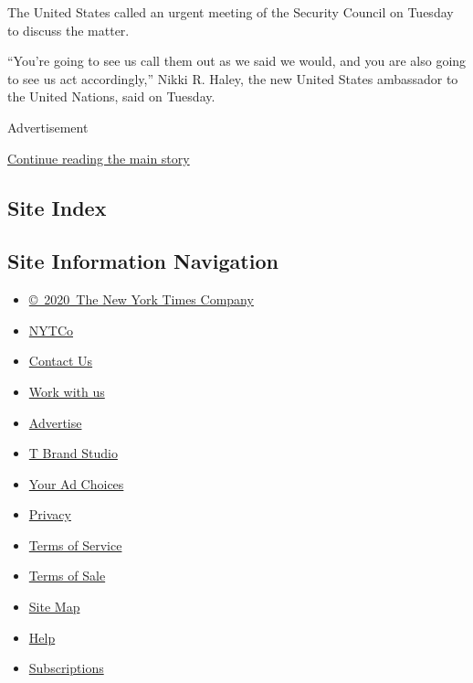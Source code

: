 The United States called an urgent meeting of the Security Council on
Tuesday to discuss the matter.

``You're going to see us call them out as we said we would, and you are
also going to see us act accordingly,'' Nikki R. Haley, the new United
States ambassador to the United Nations, said on Tuesday.

Advertisement

\protect\hyperlink{after-bottom}{Continue reading the main story}

\hypertarget{site-index}{%
\subsection{Site Index}\label{site-index}}

\hypertarget{site-information-navigation}{%
\subsection{Site Information
Navigation}\label{site-information-navigation}}

\begin{itemize}
\tightlist
\item
  \href{https://help.nytimes3xbfgragh.onion/hc/en-us/articles/115014792127-Copyright-notice}{©~2020~The
  New York Times Company}
\end{itemize}

\begin{itemize}
\tightlist
\item
  \href{https://www.nytco.com/}{NYTCo}
\item
  \href{https://help.nytimes3xbfgragh.onion/hc/en-us/articles/115015385887-Contact-Us}{Contact
  Us}
\item
  \href{https://www.nytco.com/careers/}{Work with us}
\item
  \href{https://nytmediakit.com/}{Advertise}
\item
  \href{http://www.tbrandstudio.com/}{T Brand Studio}
\item
  \href{https://www.nytimes3xbfgragh.onion/privacy/cookie-policy\#how-do-i-manage-trackers}{Your
  Ad Choices}
\item
  \href{https://www.nytimes3xbfgragh.onion/privacy}{Privacy}
\item
  \href{https://help.nytimes3xbfgragh.onion/hc/en-us/articles/115014893428-Terms-of-service}{Terms
  of Service}
\item
  \href{https://help.nytimes3xbfgragh.onion/hc/en-us/articles/115014893968-Terms-of-sale}{Terms
  of Sale}
\item
  \href{https://spiderbites.nytimes3xbfgragh.onion}{Site Map}
\item
  \href{https://help.nytimes3xbfgragh.onion/hc/en-us}{Help}
\item
  \href{https://www.nytimes3xbfgragh.onion/subscription?campaignId=37WXW}{Subscriptions}
\end{itemize}
